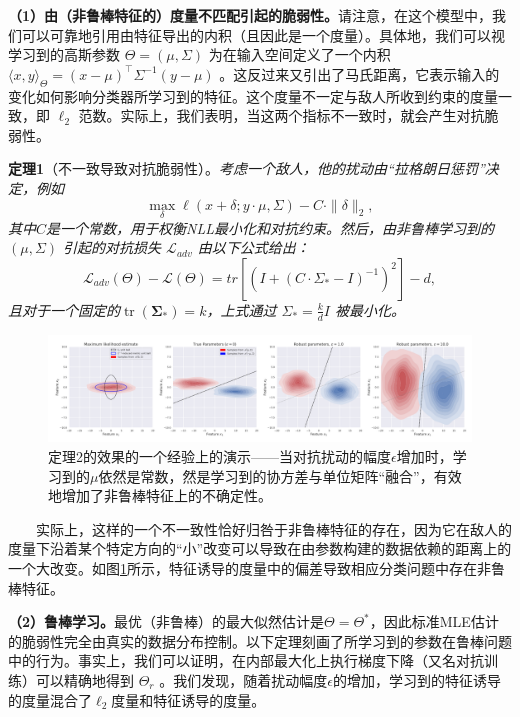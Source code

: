 \documentclass{article}
\begin{document}
\textbf{（1）由（非鲁棒特征的）度量不匹配引起的脆弱性。}请注意，在这个模型中，我们可以可靠地引用由特征导出的内积（且因此是一个度量）。具体地，我们可以视学习到的高斯参数 $\Theta=(\mu, \Sigma)$ 为在输入空间定义了一个内积 $\langle x, y\rangle_{\Theta}=(x-\mu)^{\top} \Sigma^{-1}(y-\mu)$ 。这反过来又引出了马氏距离，它表示输入的变化如何影响分类器所学习到的特征。这个度量不一定与敌人所收到约束的度量一致，即 $\ell_{2}$ 范数。实际上，我们表明，当这两个指标不一致时，就会产生对抗脆弱性。

\textbf{定理1}（不一致导致对抗脆弱性）。\textit{考虑一个敌人，他的扰动由“拉格朗日惩罚”决定，例如}
\begin{equation}
  \max _{\delta} \ell(x+\delta ; y \cdot \mu, \Sigma)-C \cdot\|\delta\|_{2},
\end{equation}
\textit{其中$C$是一个常数，用于权衡NLL最小化和对抗约束。然后，由非鲁棒学习到的 $(\mu, \Sigma)$ 引起的对抗损失 $\mathcal{L}_{a d v}$ 由以下公式给出：}
\begin{equation}
  \mathcal{L}_{a d v}(\Theta)-\mathcal{L}(\Theta)=t r\left[\left(I+\left(C \cdot \Sigma_{*}-I\right)^{-1}\right)^{2}\right]-d,
\end{equation}
\textit{且对于一个固定的$\operatorname{tr}\left(\boldsymbol{\Sigma}_{*}\right)=k$，上式通过 $\Sigma_{*}=\frac{k}{d} I$ 被最小化。}

\begin{figure}
  \centering
  \includegraphics[width=13cm]{fig/figure4.png}
  \caption{定理2的效果的一个经验上的演示——当对抗扰动的幅度$\epsilon$增加时，学习到的$\mu$依然是常数，然是学习到的协方差与单位矩阵“融合”，有效地增加了非鲁棒特征上的不确定性。}
  \label{figure:4}
\end{figure}

\ \ \ \ 实际上，这样的一个不一致性恰好归咎于非鲁棒特征的存在，因为它在敌人的度量下沿着某个特定方向的“小”改变可以导致在由参数构建的数据依赖的距离上的一个大改变。如图\ref{figure:4}所示，特征诱导的度量中的偏差导致相应分类问题中存在非鲁棒特征。

\textbf{（2）鲁棒学习。}最优（非鲁棒）的最大似然估计是$\Theta=\Theta^{*}$，因此标准MLE估计的脆弱性完全由真实的数据分布控制。以下定理刻画了所学习到的参数在鲁棒问题中的行为。事实上，我们可以证明，在内部最大化上执行梯度下降（又名对抗训练）可以精确地得到 $\Theta_{r}$ 。我们发现，随着扰动幅度$\epsilon$的增加，学习到的特征诱导的度量混合了$\ell_{2}$度量和特征诱导的度量。
\end{document}
